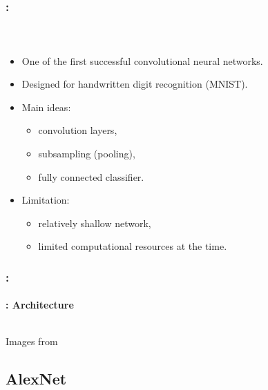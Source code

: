 \documentclass[xcolor=table]{beamer}
\begin{document}
\begin{frame}
	\frametitle{\insertshortsubtitle: \insertsection}
	\framesubtitle{\insertsubsection\ \cite{1998-lecun}}
	
	\begin{itemize}
		
		\item One of the first successful convolutional neural networks.
		
		\item Designed for handwritten digit recognition (MNIST).
		
		\item Main ideas:
		\begin{itemize}
			\item convolution layers,
			\item subsampling (pooling),
			\item fully connected classifier.
		\end{itemize}
		
		\item Limitation:
		\begin{itemize}
			\item relatively shallow network,
			\item limited computational resources at the time.
		\end{itemize}
		
	\end{itemize}
	
\end{frame}

\begin{frame}
	\frametitle{\insertshortsubtitle: \insertsection}
	\framesubtitle{\insertsubsection: Architecture}
	
	\begin{columns}
		
		
	\end{columns}
	
	\begin{center}
		Images from \cite{d2l}
	\end{center}
	
\end{frame}

\subsection{AlexNet}
\end{document}
